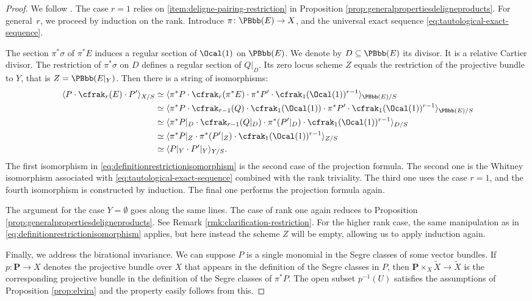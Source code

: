 \begin{proof}
We follow \cite[\textsection V.4.10]{Elkikfib}. The case $r=1$ relies on \eqref{item:deligne-pairing-restriction} in Proposition \ref{prop:generalpropertiesdeligneproducts}. For general~$r$, we proceed by induction on the rank. Introduce $\pi\colon\PBbb(E)\to X$, and the universal exact sequence \eqref{eq:tautological-exact-sequence}.

The section $\pi^{\ast}\sigma$ of $\pi^{\ast}E$ induces a regular section of $\Ocal(1)$ on $\PBbb(E)$. We denote by $D\subseteq\PBbb(E)$ its divisor. It is a relative Cartier divisor. The restriction of $\pi^{\ast}\sigma$ on $D$ defines a regular section of $Q|_{D}$. Its zero locus scheme $Z$ equals the restriction of the projective bundle to $Y$, that is $Z=\PBbb(E|_Y)$. Then there is a string of isomorphisms:
\begin{equation}\label{eq:definitionrestrictionisomorphism}
\begin{split}
\langle P \cdot \cfrak_r(E) \cdot P' \rangle_{X/S} & \simeq \langle \pi^\ast P \cdot \cfrak_r(\pi^\ast E) \cdot \pi^\ast P' \cdot \cfrak_{1}(\Ocal(1))^{r-1} \rangle_{\PBbb(E)/S} \\
& \simeq \langle \pi^\ast P \cdot \cfrak_{r-1}(Q)\cdot \cfrak_{1}(\Ocal(1)) \cdot \pi^\ast P' \cdot \cfrak_{1}(\Ocal(1))^{r-1} \rangle_{\PBbb(E)/S} \\
& \simeq \langle \pi^{\ast}P|_{D} \cdot \cfrak_{r-1}(Q|_D) \cdot \pi^\ast (P'|_D )\cdot \cfrak_{1}(\Ocal(1))^{r-1} \rangle_{D/S} \\
& \simeq \langle \pi^{\ast}P|_{Z} \cdot \pi^\ast (P'|_Z )\cdot \cfrak_{1}(\Ocal(1))^{r-1} \rangle_{Z/S} \\
& \simeq \langle P|_{Y} \cdot P'|_Y \rangle_{Y/S}.
\end{split}
\end{equation}
The first isomorphism in \eqref{eq:definitionrestrictionisomorphism} is the second case of the projection formula. The second one is the Whitney isomorphism associated with \eqref{eq:tautological-exact-sequence} combined with the rank triviality. The third one uses the case $r=1$, and the fourth isomorphism is constructed by induction. The final one performs the projection formula again.

The argument for the case $Y=\emptyset$ goes along the same lines. The case of rank one again reduces to Proposition \ref{prop:generalpropertiesdeligneproducts}. See Remark \ref{rmk:clarification-restriction}. For the higher rank case, the same manipulation as in \eqref{eq:definitionrestrictionisomorphism} applies, but here instead the scheme $Z$ will be empty, allowing us to apply induction again.

Finally, we address the birational invariance. We can suppose $P$ is a single monomial in the Segre classes of some vector bundles. If $p: \mathbf{P} \to X$ denotes the projective bundle over $X$ that appears in the definition of the Segre classes in $P$, then $\mathbf{P} \times_X \widetilde{X} \to \widetilde{X}$ is the corresponding projective bundle in the definition of the Segre classes of $\pi^\ast P$. The open subset $p^{-1}(U)$ satisfies the assumptions of Proposition \ref{prop:elvira} and the property easily follows from this.
\end{proof}
